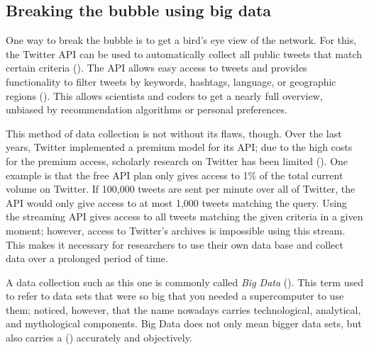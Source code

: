 \subsection{Breaking the bubble using big data}
One way to break the bubble is to get a bird's eye view of the network. For this, the Twitter API can be used to automatically collect all public tweets that match certain criteria (\cite{twitterinc.TwitterAPIs}). The API allows easy access to tweets and provides functionality to filter tweets by keywords, hashtags, language, or geographic regions (\cite{bello2017detecting}). This allows scientists and coders to get a nearly full overview, unbiased by recommendation algorithms or personal preferences.

This method of data collection is not without its flaws, though. Over the last years, Twitter implemented a premium model for its API; due to the high costs for the premium access, scholarly research on Twitter has been limited (\cite{brunsTwitterDataWhat2014}). One example is that the free API plan only gives access to 1\% of the total current volume on Twitter. If 100,000 tweets are sent per minute over all of Twitter, the API would only give access to at most 1,000 tweets matching the query. Using the streaming API gives access to all tweets matching the given criteria in a given moment; however, access to Twitter's archives is impossible using this stream. This makes it necessary for researchers to use their own data base and collect data over a prolonged period of time.

A data collection such as this one is commonly called \emph{Big Data} (\cite{crawfordCriticalQuestionsBig2012}). This term used to refer to data sets that were so big that you needed a supercomputer to use them; \citeauthor{crawfordCriticalQuestionsBig2012} noticed, however, that the name nowadays carries technological, analytical, and mythological components. Big Data does not only mean bigger data sets, but also carries a  (\cite[3]{crawfordCriticalQuestionsBig2012}) accurately and objectively.

